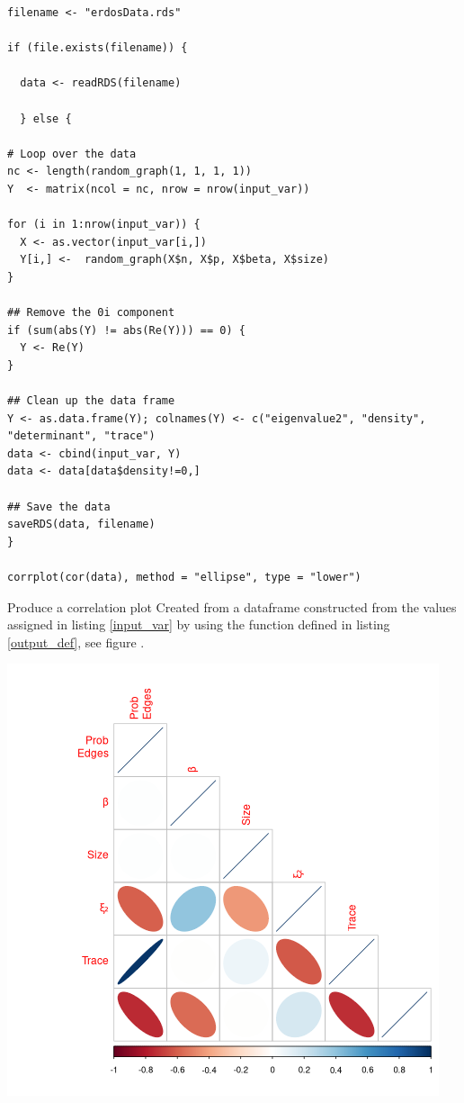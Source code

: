 \documentclass[11pt]{article}
\begin{document}
\begin{listing}[htbp]
\begin{verbatim}
filename <- "erdosData.rds"

if (file.exists(filename)) {

  data <- readRDS(filename)

  } else {

# Loop over the data
nc <- length(random_graph(1, 1, 1, 1))
Y  <- matrix(ncol = nc, nrow = nrow(input_var))

for (i in 1:nrow(input_var)) {
  X <- as.vector(input_var[i,])
  Y[i,] <-  random_graph(X$n, X$p, X$beta, X$size)
}

## Remove the 0i component
if (sum(abs(Y) != abs(Re(Y))) == 0) {
  Y <- Re(Y)
}

## Clean up the data frame
Y <- as.data.frame(Y); colnames(Y) <- c("eigenvalue2", "density", "determinant", "trace")
data <- cbind(input_var, Y)
data <- data[data$density!=0,]

## Save the data
saveRDS(data, filename)
}

corrplot(cor(data), method = "ellipse", type = "lower")
\end{verbatim}
\caption{\label{corrplot}Produce a correlation plot Created from a dataframe constructed from the values assigned in listing \ref{input_var} by using the function defined in listing \ref{output_def}, see figure .}
\end{listing}

\begin{center}
\includegraphics[width=.9\linewidth]{media/corrplot.png}
\end{center}
\end{document}
